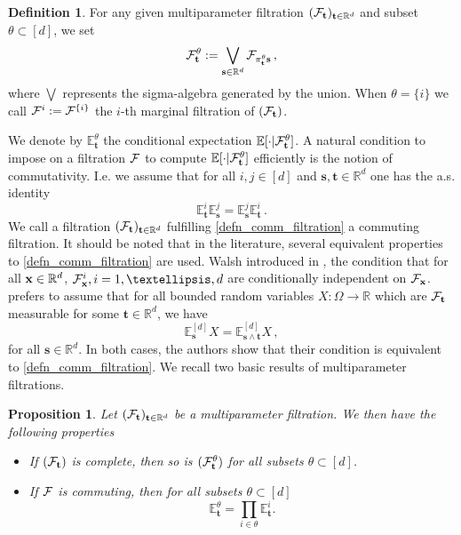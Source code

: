 \documentclass[12pt]{article}
\numberwithin{equation}{section}
\theoremstyle{plain}
\newtheorem{proposition}[theorem]{Proposition}
\theoremstyle{definition}
\newtheorem{definition}[theorem]{Definition}
\newcommand{\R}{\ensuremath{{\mathbb R}}}
\def\bR{\mathbb{R}}\def\bS{\mathbb{S}}
\def\bE{\mathbb{E}}\def\bW{\mathbb{W}}
\def\fs{\mathbf s}\def\ft{\mathbf t}
\begin{document}
\begin{definition}
For any given multiparameter filtration  $(\cF_\ft)_{\ft\in\R^d}$ and subset $\theta\subset[d]$, we set
%
\begin{equation*}
    \cF^\theta_\ft :=\bigvee_{\fs\in\R^d}\cF_{\pi^\theta_\ft\fs}\,,
\end{equation*}
%
where $\bigvee$ represents the sigma-algebra generated by the union. When  $\theta = \{i\} $ we call $\mathcal{F}^i := \mathcal{F}^{\{i\}}$ the $i$-th marginal filtration of $(\cF_\ft)$. 
\end{definition}
%
 We denote by $\bE^\theta_\ft$ the conditional expectation $\bE[\cdot\vert\cF_\ft^\theta]$. A natural condition to impose on a filtration  $\mathcal{F}$ to compute $\bE[\cdot\vert\cF_\ft^\theta]$ efficiently is the notion of commutativity. I.e. we assume that for all $i,j\in[d]$ and $\fs, \ft\in \R^d$ one has the a.s. identity
\begin{equation}\label{defn_comm_filtration}
        \bE^i_\ft \bE^j_\fs = \bE^j_\fs \bE^i_\ft\,.
\end{equation}
We call a filtration $(\cF_\ft)_{\ft\in\bR^d}$ fulfilling \eqref{defn_comm_filtration} a commuting filtration. It should be noted that in the literature, several equivalent properties to \eqref{defn_comm_filtration} are used. Walsh introduced in \cite[Section 1]{Cairoli1975},  the condition that for all $\fx\in\bR^d$, $\cF^{i}_\fx, i=1,\dots, d$ are conditionally independent on $\mathcal{F}_\mathbf x$. \cite[Section 3.4]{Khoshnevisan02}  prefers to assume that for all bounded random variables $X:\Omega\to\bR$ which are $\cF_\ft$ measurable for some $\ft\in\bR^d$, we have 
\begin{equation*}
    \bE^{[d]}_\fs X = \bE^{[d]}_{\fs\wedge\ft} X\,,
\end{equation*}
 for all $\fs\in\R^d$. In both cases, the authors show that their condition is equivalent to \eqref{defn_comm_filtration}. We recall two basic results of multiparameter filtrations.

\begin{proposition}
Let $(\cF_\ft)_{\ft\in\R^d}$ be a multiparameter filtration. We then have the following properties 
\begin{itemize}
    \item[i)] If $(\cF_\ft)$ is complete, then so is $(\cF_\ft^\theta)$ for all subsets $\theta\subset[d]$. 
    \item[ii)]  If $\mathcal{F}$ is commuting, then for all subsets $\theta\subset[d]$
    \begin{equation*}
        \bE^\theta_\ft = \prod_{i\in\theta} \bE^i_\ft.
    \end{equation*}
\end{itemize}
\end{proposition}
\end{document}

